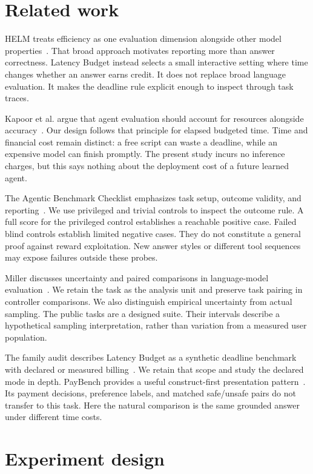 \documentclass{article}
\begin{document}
\section{Related work}
HELM treats efficiency as one evaluation dimension alongside other model properties~\cite{liang2022helm}. That broad approach motivates reporting more than answer correctness. Latency Budget instead selects a small interactive setting where time changes whether an answer earns credit. It does not replace broad language evaluation. It makes the deadline rule explicit enough to inspect through task traces.\par
Kapoor et al. argue that agent evaluation should account for resources alongside accuracy~\cite{kapoor2024agents}. Our design follows that principle for elapsed budgeted time. Time and financial cost remain distinct: a free script can waste a deadline, while an expensive model can finish promptly. The present study incurs no inference charges, but this says nothing about the deployment cost of a future learned agent.\par
The Agentic Benchmark Checklist emphasizes task setup, outcome validity, and reporting~\cite{zhu2025abc}. We use privileged and trivial controls to inspect the outcome rule. A full score for the privileged control establishes a reachable positive case. Failed blind controls establish limited negative cases. They do not constitute a general proof against reward exploitation. New answer styles or different tool sequences may expose failures outside these probes.\par
Miller discusses uncertainty and paired comparisons in language-model evaluation~\cite{miller2024errors}. We retain the task as the analysis unit and preserve task pairing in controller comparisons. We also distinguish empirical uncertainty from actual sampling. The public tasks are a designed suite. Their intervals describe a hypothetical sampling interpretation, rather than variation from a measured user population.\par
The family audit describes Latency Budget as a synthetic deadline benchmark with declared or measured billing~\cite{arab2026family}. We retain that scope and study the declared mode in depth. PayBench provides a useful construct-first presentation pattern~\cite{plunkett2026paybench}. Its payment decisions, preference labels, and matched safe/unsafe pairs do not transfer to this task. Here the natural comparison is the same grounded answer under different time costs.\par
\section{Experiment design}
\end{document}
